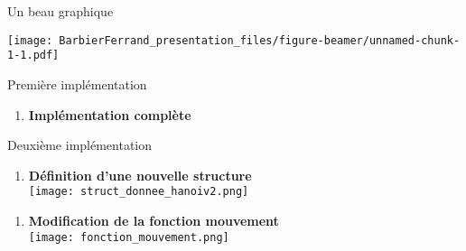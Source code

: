 
\begin{frame}{Un beau graphique}

\texttt{[image: BarbierFerrand\_presentation\_files/figure-beamer/unnamed-chunk-1-1.pdf]}

\end{frame}

\begin{frame}{Première implémentation}

\begin{enumerate}
\def\labelenumi{\arabic{enumi}.}
\tightlist
\item
  \textbf{Implémentation complète}
\end{enumerate}

\end{frame}

\begin{frame}{Deuxième implémentation}

\begin{enumerate}
\def\labelenumi{\arabic{enumi}.}
\tightlist
\item
  \textbf{Définition d'une nouvelle structure}\\
  \texttt{[image: struct\_donnee\_hanoiv2.png]}
\end{enumerate}

\end{frame}

\begin{frame}

\begin{enumerate}
\def\labelenumi{\arabic{enumi}.}
\setcounter{enumi}{1}
\tightlist
\item
  \textbf{Modification de la fonction mouvement}\\
  \texttt{[image: fonction\_mouvement.png]}
\end{enumerate}

\end{frame}
